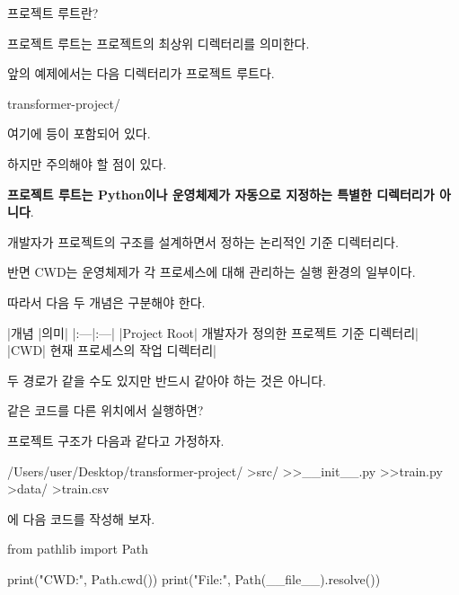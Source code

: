 \begin{dhknote}
\begin{dhksmry}[centered]
프로젝트 루트란?
\end{dhksmry}
\end{dhknote}

프로젝트 루트는 프로젝트의 최상위 디렉터리를 의미한다.

앞의 예제에서는 다음 디렉터리가 프로젝트 루트다.

\begin{dhkzsh}
transformer-project/
\end{dhkzsh}

여기에  등이 포함되어 있다.

하지만 주의해야 할 점이 있다.

\textbf{프로젝트 루트는 Python이나 운영체제가 자동으로 지정하는 특별한 디렉터리가 아니다}.

개발자가 프로젝트의 구조를 설계하면서 정하는 논리적인 기준 디렉터리다.

반면 CWD는 운영체제가 각 프로세스에 대해 관리하는 실행 환경의 일부이다.

따라서 다음 두 개념은 구분해야 한다.

\begin{dhktable}
|개념	|의미|
|:---|:---|
|Project Root|	개발자가 정의한 프로젝트 기준 디렉터리|
|CWD|	현재 프로세스의 작업 디렉터리|
\end{dhktable}

두 경로가 같을 수도 있지만 반드시 같아야 하는 것은 아니다.

\begin{dhknote}
\begin{dhksmry}[centered]
같은 코드를 다른 위치에서 실행하면?
\end{dhksmry}
\end{dhknote}

프로젝트 구조가 다음과 같다고 가정하자.

\begin{dhkdir}[in=8]
/Users/user/Desktop/transformer-project/
>src/
>>__init__.py
>>train.py
>data/
>train.csv
\end{dhkdir}

에 다음 코드를 작성해 보자.

\begin{dhkcode}
from pathlib import Path

print("CWD:", Path.cwd())
print("File:", Path(__file__).resolve())
\end{dhkcode}

